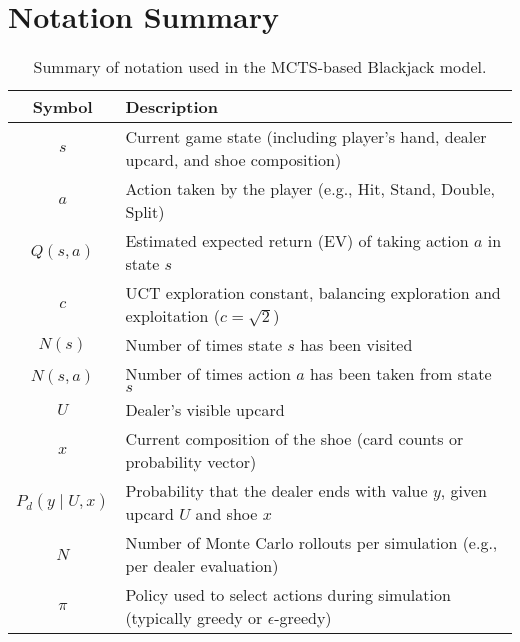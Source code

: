 \documentclass[12pt,a4paper]{cibb}
\begin{document}
\section{Notation Summary}

\begin{table}[H]
\centering
\renewcommand{\arraystretch}{1.3}
\begin{tabular}{|c|p{10cm}|}
\hline
\textbf{Symbol} & \textbf{Description} \\
\hline
$s$ & Current game state (including player's hand, dealer upcard, and shoe composition) \\
$a$ & Action taken by the player (e.g., Hit, Stand, Double, Split) \\
$Q(s, a)$ & Estimated expected return (EV) of taking action $a$ in state $s$ \\
$c$ & UCT exploration constant, balancing exploration and exploitation ($c = \sqrt{2}$) \\
$N(s)$ & Number of times state $s$ has been visited \\
$N(s, a)$ & Number of times action $a$ has been taken from state $s$ \\
$U$ & Dealer's visible upcard \\
$x$ & Current composition of the shoe (card counts or probability vector) \\
$P_d(y \mid U, x)$ & Probability that the dealer ends with value $y$, given upcard $U$ and shoe $x$ \\
$N$ & Number of Monte Carlo rollouts per simulation (e.g., per dealer evaluation) \\
$\pi$ & Policy used to select actions during simulation (typically greedy or $\epsilon$-greedy) \\
\hline
\end{tabular}
\caption{Summary of notation used in the MCTS-based Blackjack model.}
\label{tab:notation}
\end{table}

\footnotesize

 
\normalsize
\end{document}
